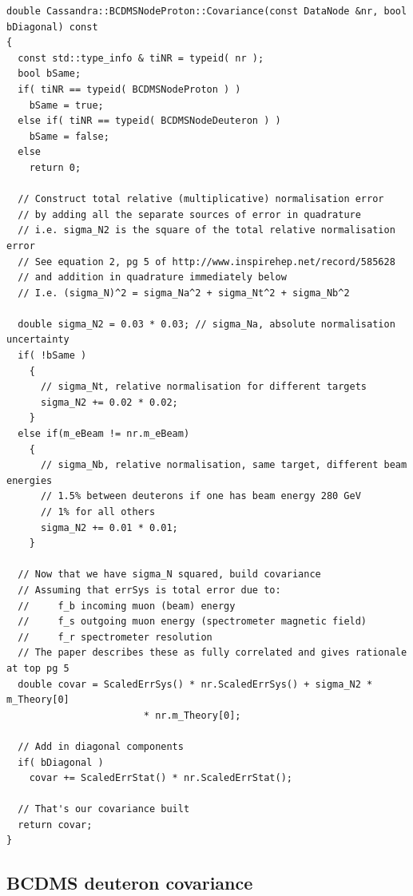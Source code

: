 \documentclass[12pt,a4paper]{report}
\begin{document}
\begin{Verbatim}[fontsize=\small]
double Cassandra::BCDMSNodeProton::Covariance(const DataNode &nr, bool bDiagonal) const
{
  const std::type_info & tiNR = typeid( nr );
  bool bSame;
  if( tiNR == typeid( BCDMSNodeProton ) )
    bSame = true;
  else if( tiNR == typeid( BCDMSNodeDeuteron ) )
    bSame = false;
  else
    return 0;

  // Construct total relative (multiplicative) normalisation error
  // by adding all the separate sources of error in quadrature
  // i.e. sigma_N2 is the square of the total relative normalisation error
  // See equation 2, pg 5 of http://www.inspirehep.net/record/585628
  // and addition in quadrature immediately below
  // I.e. (sigma_N)^2 = sigma_Na^2 + sigma_Nt^2 + sigma_Nb^2

  double sigma_N2 = 0.03 * 0.03; // sigma_Na, absolute normalisation uncertainty
  if( !bSame )
    {
      // sigma_Nt, relative normalisation for different targets
      sigma_N2 += 0.02 * 0.02;
    }
  else if(m_eBeam != nr.m_eBeam)
    {
      // sigma_Nb, relative normalisation, same target, different beam energies
      // 1.5% between deuterons if one has beam energy 280 GeV
      // 1% for all others
      sigma_N2 += 0.01 * 0.01;
    }

  // Now that we have sigma_N squared, build covariance
  // Assuming that errSys is total error due to:
  //     f_b incoming muon (beam) energy
  //     f_s outgoing muon energy (spectrometer magnetic field)
  //     f_r spectrometer resolution
  // The paper describes these as fully correlated and gives rationale at top pg 5
  double covar = ScaledErrSys() * nr.ScaledErrSys() + sigma_N2 * m_Theory[0]
                        * nr.m_Theory[0];

  // Add in diagonal components
  if( bDiagonal )
    covar += ScaledErrStat() * nr.ScaledErrStat();

  // That's our covariance built
  return covar;
}
\end{Verbatim}

\subsection{BCDMS deuteron \cite{BCDMS:Deuteron} covariance}
\end{document}
